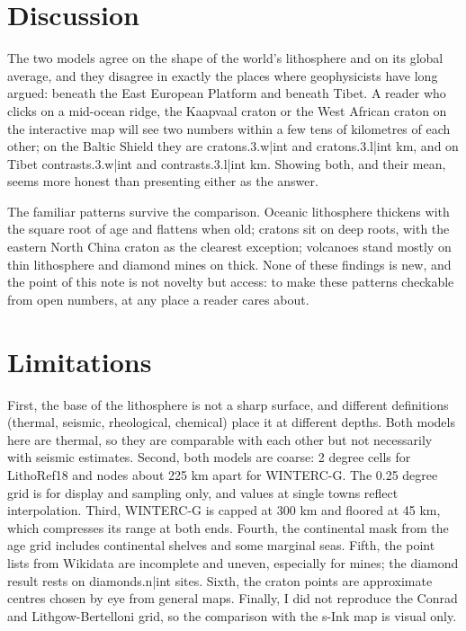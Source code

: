 \documentclass[11pt,a4paper]{article}
\begin{document}
\section{Discussion}

The two models agree on the shape of the world's lithosphere and on its global average, and they disagree in exactly the places where geophysicists have long argued: beneath the East European Platform and beneath Tibet. A reader who clicks on a mid-ocean ridge, the Kaapvaal craton or the West African craton on the interactive map will see two numbers within a few tens of kilometres of each other; on the Baltic Shield they are {{cratons.3.w|int}} and {{cratons.3.l|int}} km, and on Tibet {{contrasts.3.w|int}} and {{contrasts.3.l|int}} km. Showing both, and their mean, seems more honest than presenting either as the answer.

The familiar patterns survive the comparison. Oceanic lithosphere thickens with the square root of age and flattens when old; cratons sit on deep roots, with the eastern North China craton as the clearest exception; volcanoes stand mostly on thin lithosphere and diamond mines on thick. None of these findings is new, and the point of this note is not novelty but access: to make these patterns checkable from open numbers, at any place a reader cares about.

\section{Limitations}

First, the base of the lithosphere is not a sharp surface, and different definitions (thermal, seismic, rheological, chemical) place it at different depths. Both models here are thermal, so they are comparable with each other but not necessarily with seismic estimates. Second, both models are coarse: 2 degree cells for LithoRef18 and nodes about 225 km apart for WINTERC-G. The 0.25 degree grid is for display and sampling only, and values at single towns reflect interpolation. Third, WINTERC-G is capped at 300 km and floored at 45 km, which compresses its range at both ends. Fourth, the continental mask from the age grid includes continental shelves and some marginal seas. Fifth, the point lists from Wikidata are incomplete and uneven, especially for mines; the diamond result rests on {{diamonds.n|int}} sites. Sixth, the craton points are approximate centres chosen by eye from general maps. Finally, I did not reproduce the Conrad and Lithgow-Bertelloni grid, so the comparison with the s-Ink map is visual only.
\end{document}
